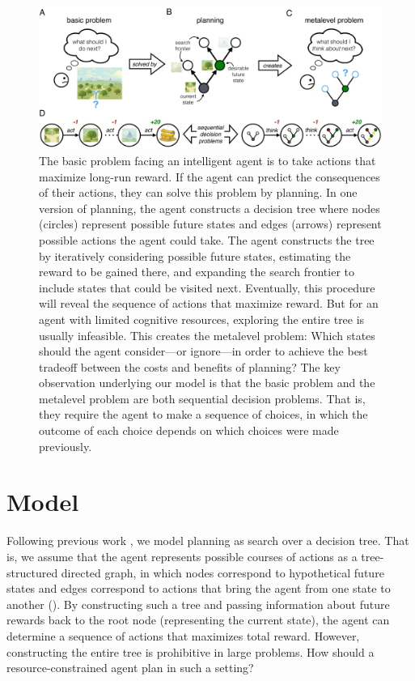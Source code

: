 \begin{figure}[ht]
    \centering
    \includegraphics[width=\textwidth]{figs/planning/fig1.pdf}
    \caption{
       The basic problem facing an intelligent agent is to take actions that maximize long-run reward. If the agent can predict the consequences of their actions, they can solve this problem by planning.
       In one version of planning, the agent constructs a decision tree where nodes (circles) represent possible future states and edges (arrows) represent possible actions the agent could take. The agent constructs the tree by iteratively considering possible future states, estimating the reward to be gained there, and expanding the search frontier to include states that could be visited next. Eventually, this procedure will reveal the sequence of actions that maximize reward. But for an agent with limited cognitive resources, exploring the entire tree is usually infeasible. 
      This creates the metalevel problem:
       Which states should the agent consider---or ignore---in order to achieve the best tradeoff between the costs and benefits of planning?
       The key observation underlying our model is that the basic problem and the metalevel problem are both sequential decision problems. 
      That is, they require the agent to make a sequence of choices, in which the outcome of each choice depends on which choices were made previously. 
    }
    \label{fig:planning-model}
\end{figure}

\section{Model}\label{sec:planning-model}

Following previous work \citep{huys2012bonsai,huys2015interplay,vanopheusden2017computational,sezener2019optimizing}, we model planning as search over a decision tree. That is, we assume that the agent represents possible courses of actions as a tree-structured directed graph, in which nodes correspond to hypothetical future states and edges correspond to actions that bring the agent from one state to another (). By constructing such a tree and passing information about future rewards back to the root node (representing the current state), the agent can determine a sequence of actions that maximizes total reward. However, constructing the entire tree is prohibitive in large problems. How should a resource-constrained agent plan in such a setting?

